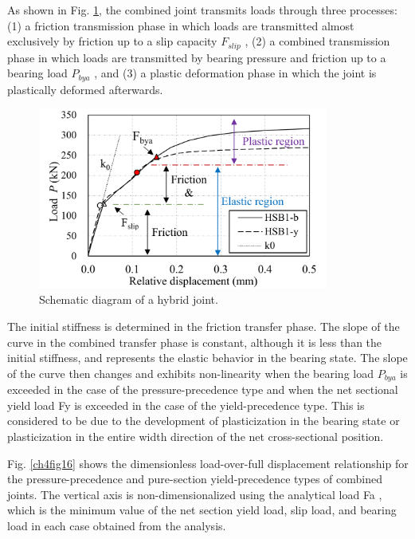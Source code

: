 As shown in Fig. \ref{ch4fig15}, the combined joint transmits loads through three processes: (1) a friction transmission phase in which loads are transmitted almost exclusively by friction up to a slip capacity $F_{slip}$ , (2) a combined transmission phase in which loads are transmitted by bearing pressure and friction up to a bearing load $P_{bya}$ , and (3) a plastic deformation phase in which the joint is plastically deformed afterwards.

\begin{figure}
    \centering
    \includegraphics[width=0.85\textwidth]{imgs/ch4/fig15.pdf}
    \caption{Schematic diagram of a hybrid joint.}
    \label{ch4fig15}
\end{figure}

The initial stiffness is determined in the friction transfer phase. The slope of the curve in the combined transfer phase is constant, although it is less than the initial stiffness, and represents the elastic behavior in the bearing state. The slope of the curve then changes and exhibits non-linearity when the bearing load $P_{bya}$ is exceeded in the case of the pressure-precedence type and when the net sectional yield load Fy is exceeded in the case of the yield-precedence type. This is considered to be due to the development of plasticization in the bearing state or plasticization in the entire width direction of the net cross-sectional position.

Fig. \ref{ch4fig16} shows the dimensionless load-over-full displacement relationship for the pressure-precedence and pure-section yield-precedence types of combined joints. The vertical axis is non-dimensionalized using the analytical load Fa , which is the minimum value of the net section yield load, slip load, and bearing load in each case obtained from the analysis.

